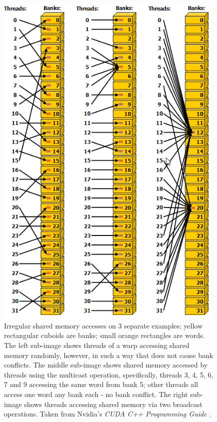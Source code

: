 \begin{figure}[h!]
	\centering
	\includegraphics[width=11cm, keepaspectratio]{images/ch1/CUDA_shared_memory_banks_words_no_conflicts.png}
	\caption{Irregular shared memory accesses on 3 separate examples; yellow rectangular cuboids are banks; small orange rectangles are words. The left sub-image shows threads of a warp accessing shared memory randomly, however, in such a way that does not cause bank conflicts. The middle sub-image shows shared memory accessed by threads using the multicast operation, specifically, threads 3, 4, 5, 6, 7 and 9 accessing the same word from bank 5; other threads all access one word any bank each - no bank conflict. The right sub-image shows threads accessing shared memory via two broadcast operations. Taken from Nvidia's \emph{CUDA C++ Programming Guide} \cite{NVIDIAMay2022}.}
	\label{Figure:CUDA-shared-memory-banks-words-no-conflicts}
\end{figure}

